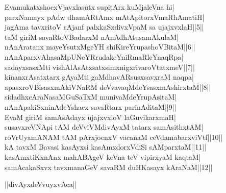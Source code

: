 \documentclass{article}
\begin{document}
EvamukatxshocxVjavxlasutx supitArx kuMjaleVna hi|\\
parxNamayx pAdw dhamARtAmx mAtApitorxVmaRhAmatiH|\\
jagAma tavxritoV rAjanf palxkaSxdivxVpaM sa ujajxvxlaH||5||\\
taM giriM savaRtoVBadarxM nAnAdhAtusamAkulaM|\\
nAnAratanx mayeYsutxMgeYH shiKireYrupashoVBitaM||6||\\
nAnAparxvAhasaMpUNeYRrudakeYniRmaRleYnaqRpa|\\
sadayxsasxMti vishAlAsAtxsatxsimxnigxrivaroVtatxmeV||7||\\
kinanxrAsatxtarx gAyaMti gaMdhavARsusxsavxraM naqpa|\\
apasxroVBisasxmAkiVNaRM deVvavaqMdeYsasxmAshirxtaM||8||\\
sidadhxcAraNasaMGuSaTxM munivaMdeYrupAsitaM|\\
nAnApakiSxninAdeYshacx savaRtarx parinAditaM||9||\\
EvaM giriM samAsAdayx ujajxvxloV laGuvikarxmaH|\\
susavxreVNApi tAM deVviVMdivAyxM tatarx samAsithxtAM|\\
roVrUyamANAM tAM pArxjocnxV vacanaM ceVdamabarxviVtf||10||\\
kA tavxM Bavasi kasAyxsi kasAmxdorxVdiSi sAMparxtaM||11||\\
kasAmxtiKxnAnx mahABAgeV keVna teV vipirxyaM kaqtaM|\\
samAcakaSxvx tavxmanaGeV savaRM duHKasayx kAraNaM||12||\\

\begin{center}
||divAyxdeVvuyxvAca||
\end{center}
\end{document}
